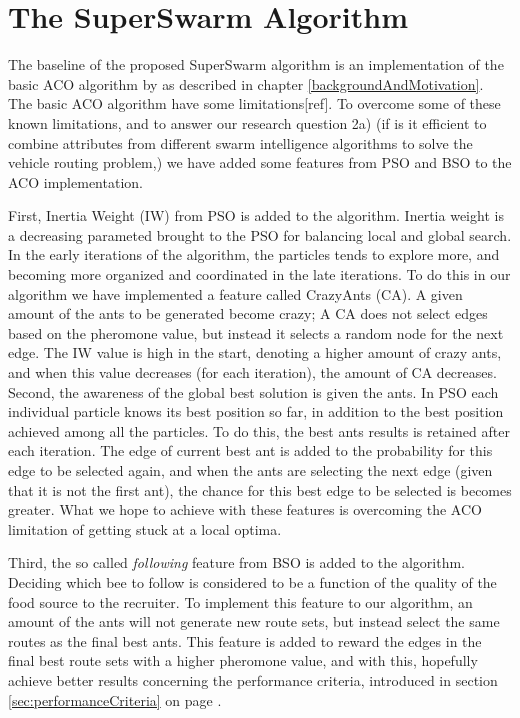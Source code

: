 \section{The SuperSwarm Algorithm}

The baseline of the proposed SuperSwarm algorithm is an implementation of the basic ACO algorithm by \citet{nanda11} as described in chapter \ref{backgroundAndMotivation}. The basic ACO algorithm have some limitations[ref]. To overcome some of these known limitations, and to answer our research question 2a) (if is it efficient to combine attributes from different swarm intelligence algorithms to solve the vehicle routing problem,) we have added some features from PSO and BSO to the ACO implementation.

First, Inertia Weight (IW) from PSO is added to the algorithm. Inertia weight is a decreasing parameted brought to the PSO for balancing local and global search. In the early iterations of the algorithm, the particles tends to explore more, and becoming more organized and coordinated in the late iterations.  To do this in our algorithm we have implemented a feature called CrazyAnts (CA). A given amount of the ants to be generated become crazy; A CA does not select edges based on the pheromone value, but instead it selects a random node for the next edge. The IW value is high in the start, denoting a higher amount of crazy ants, and when this value decreases (for each iteration), the amount of CA decreases. Second, the awareness of the global best solution is given the ants. In PSO each individual particle knows its best position so far, in addition to the best position achieved among all the particles. To do this, the best ants results is retained after each iteration. The edge of current best ant is added to the probability for this edge to be selected again, and when the ants are selecting the next edge (given that it is not the first ant), the chance for this best edge to be selected is becomes greater. What we hope to achieve with these features is overcoming the ACO limitation of getting stuck at a local optima.

Third, the so called \textit{following} feature from BSO is added to the algorithm. Deciding which bee to follow is considered to be a function of the quality of the food source to the recruiter. To implement this feature to our algorithm, an amount of the ants will not generate new route sets, but instead select the same routes as the final best ants. This feature is added to reward the edges in the final best route sets with a higher pheromone value, and with this, hopefully achieve better results concerning the performance criteria, introduced in section \ref{sec:performanceCriteria} on page \pageref{sec:performanceCriteria}. 




